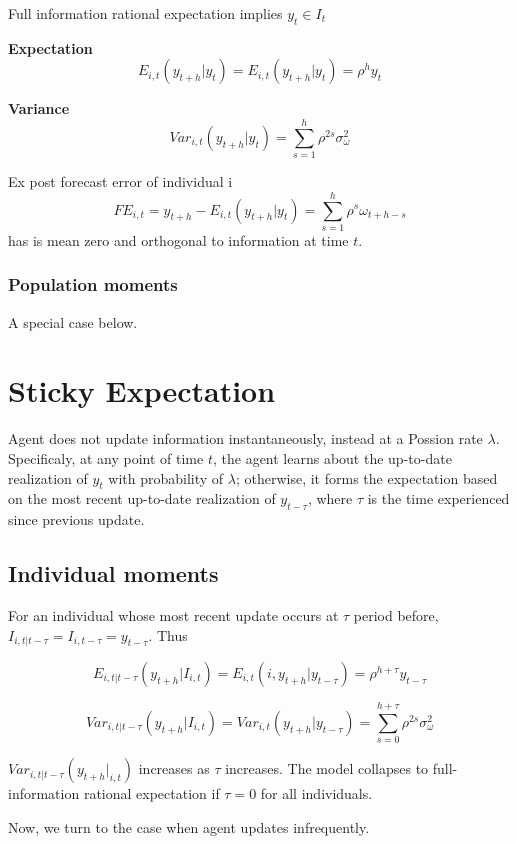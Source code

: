 \documentclass[]{article}
\begin{document}
Full information rational expectation implies $y_t \in I_t$

\textbf{Expectation}
$$E_{i,t}(y_{t+h}|y_t) = E_{i,t}(y_{t+h}|y_t) = \rho^h y_t $$

\textbf{Variance} 
$$Var_{i,t}(y_{t+h}|y_t) = \sum^{h}_{s=1}\rho^{2s} \sigma^2_{\omega}$$

Ex post forecast error of individual i $$FE_{i,t} = y_{t+h} - E_{i,t}(y_{t+h}|y_t) = \sum^h_{s=1} \rho^s \omega_{t+h-s}$$ has is mean zero and orthogonal to information at time $t$. 

\subsubsection{Population moments} 

A special case below.

\section{Sticky Expectation}

Agent does not update information instantaneously, instead at a Possion rate $\lambda$. Specificaly, at any point of time $t$, the agent learns about the up-to-date realization of $y_t$ with probability of $\lambda$; otherwise, it forms the expectation based on the most recent up-to-date realization of $y_{t-\tau}$, where $\tau$ is the time experienced since previous update. 

\subsection{Individual moments} 

For an individual whose most recent update occurs at $\tau$ period before, $I_{i,t|t-\tau} = I_{i,t-\tau} = y_{t-\tau}$. Thus

$$E_{i,t|t-\tau}(y_{t+h}|I_{i,t}) = E_{i,t}(i,y_{t+h}|y_{t-\tau}) = \rho^{h+\tau} y_{t-\tau}$$

$$Var_{i,t|t-\tau}(y_{t+h}|I_{i,t}) = Var_{i,t}(y_{t+h}|y_{t-\tau}) = \sum^{h+\tau}_{s=0}\rho^{2s} \sigma^2_{\omega}$$

$Var_{i,t|t-\tau}(y_{t+h}|_{i,t})$ increases as $\tau$ increases. The model collapses to full-information rational expectation if $\tau=0$ for all individuals. 

Now, we turn to the case when agent updates infrequently. 
\end{document}
